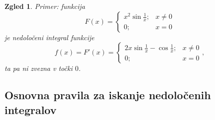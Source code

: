 \documentclass[10pt, a4paper]{article}
\newtheorem{zgled}[izr]{Zgled}
\begin{document}
\begin{zgled}
    Primer: funkcija $$F(x) = \begin{cases}
        x^2 \sin \frac{1}{x} ;& x \neq 0\\
        0;& x = 0
    \end{cases}$$ je nedoločeni integral funkcije $$f(x) = F'(x) = \begin{cases}
        2x \sin \frac{1}{x} - \cos \frac{1}{x} ;& x \neq 0\\
        0;& x = 0
    \end{cases},$$ ta pa ni zvezna v točki $0$.
\end{zgled}

\subsection{Osnovna pravila za iskanje nedoločenih integralov}
\end{document}
